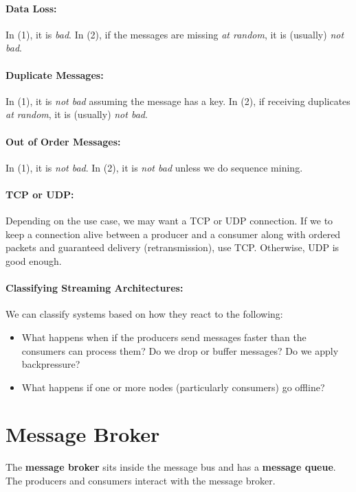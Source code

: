 \documentclass{report}
\newenvironment{definition}[1]{\begin{tcolorbox}[title={Definition: #1}]}{\end{tcolorbox}}
\renewcommand{\bf}[1]{\textbf{{#1}}}
\renewcommand{\it}[1]{\textit{{#1}}}
\begin{document}
\paragraph{Data Loss:} In (1), it is \it{bad}. In (2), if the messages are
missing \it{at random}, it is (usually) \it{not bad}.

\paragraph{Duplicate Messages:} In (1), it is \it{not bad} assuming the message
has a key. In (2), if receiving duplicates \it{at random}, it is (usually)
\it{not bad}.

\paragraph{Out of Order Messages:} In (1), it is \it{not bad}. In (2), it is
\it{not bad} unless we do sequence mining.

\paragraph{TCP or UDP:} Depending on the use case, we may want a TCP or UDP
connection. If we to keep a connection alive between a producer and a consumer
along with ordered packets and guaranteed delivery (retransmission), use TCP.
Otherwise, UDP is good enough.

\paragraph{Classifying Streaming Architectures:}
We can classify systems based on how they react to the following:
\begin{itemize}[label=$\to$]
    \item What happens when if the producers send messages faster than the
        consumers can process them? Do we drop or buffer messages? Do we apply
        backpressure?
    \item What happens if one or more nodes (particularly consumers) go offline?
\end{itemize}

\section{Message Broker}
\begin{definition}{Message Broker}
    The \bf{message broker} sits inside the message bus and has a \bf{message queue}.
    The producers and consumers interact with the message broker.
\end{definition}
\end{document}
